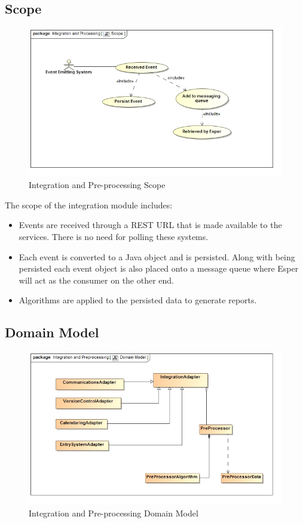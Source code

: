 \documentclass[11pt,a4paper]{article}
\begin{document}
\subsection{Scope}
\begin{figure}[H]
	\begin{center}
		\includegraphics[scale=0.6]{../Images/Integration_Scope.jpg}
		\caption{Integration and Pre-processing Scope}
	\end{center}
\end{figure}
The scope of the integration module includes:
\begin{itemize}
	\item Events are received through a REST URL that is made available to the services. There is no need for polling these systems.
	\item Each event is converted to a Java object and is persisted. Along with being persisted each event object is also placed onto a message queue where Esper will act as the consumer on the other end.
	\item Algorithms are applied to the persisted data to generate reports.
\end{itemize}

\subsection{Domain Model}
\begin{figure}[H]
	\begin{center}
		\includegraphics[scale=0.75]{../Images/Integration_Domain.jpg}
		\caption{Integration and Pre-processing Domain Model}
	\end{center}
\end{figure}
\end{document}

